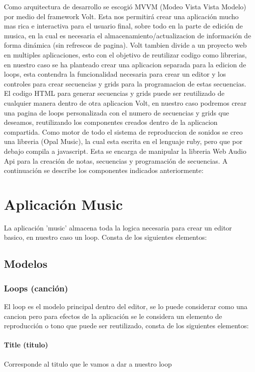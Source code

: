 Como arquitectura de desarrollo se escogió MVVM (Modeo Vista Vista Modelo) por
medio del framework Volt.
Esta nos permitirá crear una aplicación mucho mas rica e interactiva para
el usuario final, sobre todo en la parte de edición de musica, en la cual
es necesaria el almacenamiento/actualizacion de información de forma
dinámica (sin refrescos de pagina).
Volt tambien divide a un proyecto web en multiples aplicaciones, esto con
el objetivo de reutilizar codigo como librerias, en nuestro caso se ha
planteado crear una aplicacion separada para la edicion de loops, esta
contendra la funcionalidad necesaria para crear un editor y los controles para
crear secuencias y grids para la programacion de estas secuencias. El codigo
HTML para generar secuencias y grids puede ser reutilizado de cualquier manera
dentro de otra aplicacion Volt, en nuestro caso podremos crear una pagina de loops
personalizada con el numero de secuencias y grids que deseamos, reutilizando los
componentes creados dentro de la aplicacion compartida.
Como motor de todo el sistema de reproduccion de sonidos se creo una libreria
(Opal Music), la cual esta escrita en el lenguaje ruby, pero que por debajo
compila a javascript. Esta se encarga de manipular la libreria Web Audio
Api para la creación de notas, secuencias y programación de secuencias.
A continuación se describe los componentes indicados anteriormente:

\section{Aplicación Music}

La aplicación 'music' almacena toda la logica necesaria para crear
un editor basico, en nuestro caso un loop. Consta de los siguientes elementos:

\subsection{Modelos}
\subsubsection{Loops (canción)}
El loop es el modelo principal dentro del editor, se lo puede considerar como
una cancion pero para efectos de la aplicación se le considera un elemento de
reproducción o tono que puede ser reutilizado, consta de los siguientes elementos:
\paragraph{Title (titulo)}
Corresponde al titulo que le vamos a dar a nuestro loop
